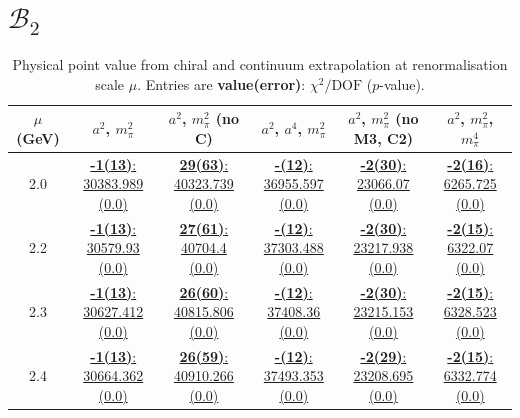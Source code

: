 \documentclass[12pt]{extarticle}
\begin{document}
\section{$\mathcal{B}_2$}
\begin{table}[h!]
\begin{center}
\begin{tabular}{|c|c|c|c|c|c|}
\hline
$\mu$ (GeV) & $a^2$, $m_\pi^2$& $a^2$, $m_\pi^2$ (no C)& $a^2$, $a^4$, $m_\pi^2$& $a^2$, $m_\pi^2$ (no M3, C2)& $a^2$, $m_\pi^2$, $m_\pi^4$\\
\hline
2.0& \hyperlink{VVmAA/NPR/a2m2_20.pdf.1}{\textbf{-1(13)}: 30383.989 (0.0)} & \hyperlink{VVmAA/NPR/a2m2noC_20.pdf.1}{\textbf{29(63)}: 40323.739 (0.0)} & \hyperlink{VVmAA/NPR/a2a4m2_20.pdf.1}{\textbf{-(12)}: 36955.597 (0.0)} & \hyperlink{VVmAA/NPR/a2m2mcut_20.pdf.1}{\textbf{-2(30)}: 23066.07 (0.0)} & \hyperlink{VVmAA/NPR/a2m2m4_20.pdf.1}{\textbf{-2(16)}: 6265.725 (0.0)}\\
2.2& \hyperlink{VVmAA/NPR/a2m2_22.pdf.1}{\textbf{-1(13)}: 30579.93 (0.0)} & \hyperlink{VVmAA/NPR/a2m2noC_22.pdf.1}{\textbf{27(61)}: 40704.4 (0.0)} & \hyperlink{VVmAA/NPR/a2a4m2_22.pdf.1}{\textbf{-(12)}: 37303.488 (0.0)} & \hyperlink{VVmAA/NPR/a2m2mcut_22.pdf.1}{\textbf{-2(30)}: 23217.938 (0.0)} & \hyperlink{VVmAA/NPR/a2m2m4_22.pdf.1}{\textbf{-2(15)}: 6322.07 (0.0)}\\
2.3& \hyperlink{VVmAA/NPR/a2m2_23.pdf.1}{\textbf{-1(13)}: 30627.412 (0.0)} & \hyperlink{VVmAA/NPR/a2m2noC_23.pdf.1}{\textbf{26(60)}: 40815.806 (0.0)} & \hyperlink{VVmAA/NPR/a2a4m2_23.pdf.1}{\textbf{-(12)}: 37408.36 (0.0)} & \hyperlink{VVmAA/NPR/a2m2mcut_23.pdf.1}{\textbf{-2(30)}: 23215.153 (0.0)} & \hyperlink{VVmAA/NPR/a2m2m4_23.pdf.1}{\textbf{-2(15)}: 6328.523 (0.0)}\\
2.4& \hyperlink{VVmAA/NPR/a2m2_24.pdf.1}{\textbf{-1(13)}: 30664.362 (0.0)} & \hyperlink{VVmAA/NPR/a2m2noC_24.pdf.1}{\textbf{26(59)}: 40910.266 (0.0)} & \hyperlink{VVmAA/NPR/a2a4m2_24.pdf.1}{\textbf{-(12)}: 37493.353 (0.0)} & \hyperlink{VVmAA/NPR/a2m2mcut_24.pdf.1}{\textbf{-2(29)}: 23208.695 (0.0)} & \hyperlink{VVmAA/NPR/a2m2m4_24.pdf.1}{\textbf{-2(15)}: 6332.774 (0.0)}\\
\hline
\end{tabular}
\caption{Physical point value from chiral and continuum extrapolation at renormalisation scale $\mu$. Entries are \textbf{value(error)}: $\chi^2/\text{DOF}$ ($p$-value).}
\end{center}
\end{table}
\end{document}
